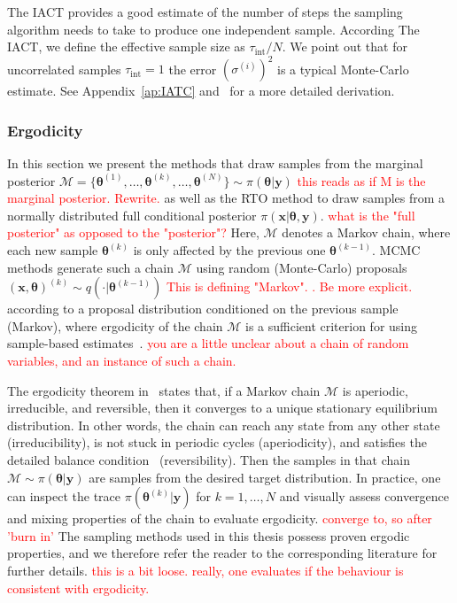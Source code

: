 The IACT provides a good estimate of the number of steps the sampling algorithm needs to take to produce one independent sample.
According The IACT, we define the effective sample size as $ \tau_{\text{int}} /N$.
We point out that for uncorrelated samples $\tau_{\text{int}} = 1$ the error $(\sigma^{(i)})^2$ is a typical Monte-Carlo estimate.
See Appendix~\ref{ap:IATC} and~\cite{Sokal1997, wolff2004monte, wolff2002LecNot} for a more detailed derivation.

\subsubsection{Ergodicity}

In this section we present the methods that draw samples from the marginal posterior $ \mathcal{M} = \{  \bm{\theta}^{(1)}, \dots,  \bm{\theta}^{(k)}, \dots, \bm{\theta}^{(N)} \} \sim \pi(\bm{\theta} |  \bm{y})$ \textcolor{red}{this reads as if M is the marginal posterior. Rewrite.} as well as the RTO method to draw samples from a normally distributed full conditional posterior $\pi(\bm{x}|\bm{\theta} , \bm{y})$. \textcolor{red}{what is the "full posterior" as opposed to the "posterior"?}
Here, $\mathcal{M}$ denotes a Markov chain, where each new sample $\bm{\theta}^{(k)}$ is only affected by the previous one $\bm{\theta}^{(k-1)}$.
MCMC methods generate such a chain $\mathcal{M}$ using random (Monte-Carlo) proposals $(\bm{x}, \bm{\theta})^{(k)} \sim q( \cdot |  \bm{\theta}^{(k-1)})$ \textcolor{red}{This is defining "Markov". . Be more explicit.} according to a proposal distribution conditioned on the previous sample (Markov), where ergodicity of the chain $\mathcal{M}$ is a sufficient criterion for using sample-based estimates~\cite{tan2016LecNot, roberts2004general}. \textcolor{red}{you are a little unclear about a chain of random variables, and an instance of such a chain.}

The ergodicity theorem in~\cite{tan2016LecNot} states that, if a Markov chain $\mathcal{M}$ is aperiodic, irreducible, and reversible, then it converges to a unique stationary equilibrium distribution.
In other words, the chain can reach any state from any other state (irreducibility), is not stuck in periodic cycles (aperiodicity), and satisfies the detailed balance condition~\cite{tan2016LecNot} (reversibility).
Then the samples in that chain $ \mathcal{M} \sim \pi( \bm{\theta} |  \bm{y})$ are samples from the desired target distribution.
In practice, one can inspect the trace $\pi(\bm{\theta}^{(k)} |  \bm{y})$ for $k = 1, \dots, N$ and visually assess convergence and mixing properties of the chain to evaluate ergodicity. \textcolor{red}{converge to, so after 'burn in'}
The sampling methods used in this thesis possess proven ergodic properties, and we therefore refer the reader to the corresponding literature for further details. \textcolor{red}{this is a bit loose. really, one evaluates if the behaviour is consistent with ergodicity.}

